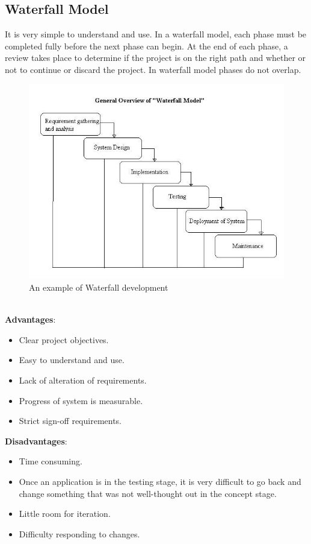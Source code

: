 \documentclass[a4paper, 12pt]{report}
\begin{document}
\subsection{Waterfall Model}
It is very simple to understand and use. In a waterfall model, each phase must be completed fully before the next phase can begin. At the end of each phase, a review takes place to determine if the project is on the right path and whether or not to continue or discard the project. In waterfall model phases do not overlap\cite{waterfall}.
\begin{figure}[!htbp]
  \centering
    \includegraphics[width=1.0\textwidth]{Waterfall-model.jpg}
    \caption{An example of Waterfall development\cite{prototype}}
    \label{fig:waterfall-dev}
\end{figure}\\
\textbf{Advantages}:
\begin{itemize}
\item Clear project objectives.
\item Easy to understand and use.
\item Lack of alteration of requirements.
\item Progress of system is measurable.
\item Strict sign-off requirements. 
\end{itemize}
\textbf{Disadvantages}:
\begin{itemize}
\item Time consuming.
\item Once an application is in the testing stage, it is very difficult to go back and change something that was not well-thought out in the concept stage. 
\item Little room for iteration. 
\item Difficulty responding to changes.
\end{itemize}
\end{document}
